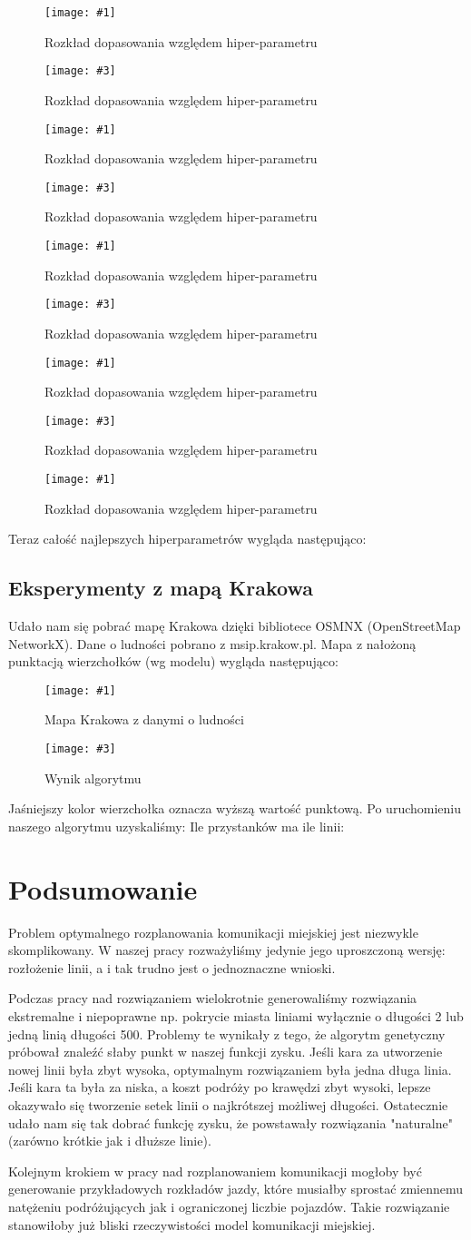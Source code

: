 \documentclass[12pt,a4paper]{article}
\newcommand{\imgcustomsize}[3]{
	\begin{figure}[H]
		\centering
		\texttt{[image: \#1]}
		\caption{#2}
	\end{figure}
}
\newcommand{\imgsidebyside}[4]{
	\begin{figure}[H]
		\centering
		\begin{minipage}{.45\textwidth}
			\centering
			\texttt{[image: \#1]}
			\caption{#2}
		\end{minipage}%
		\hfill
		\begin{minipage}{.45\textwidth}
			\centering
			\texttt{[image: \#3]}
			\caption{#4}
		\end{minipage}
	\end{figure}
}
\begin{document}
\imgsidebyside{gs4/1}{Rozkład dopasowania względem hiper-parametru}{gs4/2}{Rozkład dopasowania względem hiper-parametru}
\imgsidebyside{gs4/3}{Rozkład dopasowania względem hiper-parametru}{gs4/4}{Rozkład dopasowania względem hiper-parametru}
\imgsidebyside{gs4/5}{Rozkład dopasowania względem hiper-parametru}{gs4/6}{Rozkład dopasowania względem hiper-parametru}
\imgsidebyside{gs4/7}{Rozkład dopasowania względem hiper-parametru}{gs4/8}{Rozkład dopasowania względem hiper-parametru}
\imgcustomsize{gs4/9}{Rozkład dopasowania względem hiper-parametru}{0.5}

Teraz całość najlepszych hiperparametrów wygląda następująco:


\subsection{Eksperymenty z mapą Krakowa}
Udało nam się pobrać mapę Krakowa dzięki bibliotece OSMNX (OpenStreetMap NetworkX). Dane o ludności pobrano z msip.krakow.pl. Mapa z nałożoną punktacją wierzchołków (wg modelu) wygląda następująco:
\imgsidebyside{krk}{Mapa Krakowa z danymi o ludności}{krk1.png}{Wynik algorytmu}
Jaśniejszy kolor wierzchołka oznacza wyższą wartość punktową.
Po uruchomieniu naszego algorytmu uzyskaliśmy:
Ile przystanków ma ile linii:


\section{Podsumowanie}

Problem optymalnego rozplanowania komunikacji miejskiej jest niezwykle skomplikowany. W naszej pracy rozważyliśmy jedynie jego uproszczoną wersję: rozłożenie linii, a i tak trudno jest o jednoznaczne wnioski.

Podczas pracy nad rozwiązaniem wielokrotnie generowaliśmy rozwiązania ekstremalne i niepoprawne np. pokrycie miasta liniami wyłącznie o długości 2 lub jedną linią długości 500. Problemy te wynikały z tego, że algorytm genetyczny próbował znaleźć słaby punkt w naszej funkcji zysku. Jeśli kara za utworzenie nowej linii była zbyt wysoka, optymalnym rozwiązaniem była jedna długa linia. Jeśli kara ta była za niska, a koszt podróży po krawędzi zbyt wysoki, lepsze okazywało się tworzenie setek linii o najkrótszej możliwej długości. Ostatecznie udało nam się tak dobrać funkcję zysku, że powstawały rozwiązania "naturalne" (zarówno krótkie jak i dłuższe linie).

Kolejnym krokiem w pracy nad rozplanowaniem komunikacji mogłoby być generowanie przykładowych rozkładów jazdy, które musiałby sprostać zmiennemu natężeniu podróżujących jak i ograniczonej liczbie pojazdów. Takie rozwiązanie stanowiłoby już bliski rzeczywistości model komunikacji miejskiej.
\end{document}
